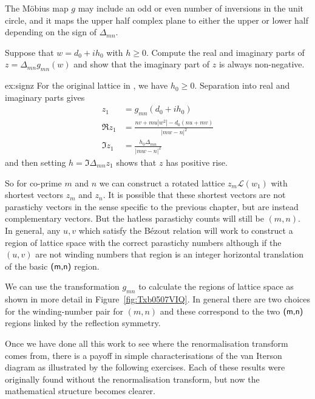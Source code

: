 The M\"obius map $g$ may include an odd or even number of inversions in the unit circle, and it maps the upper half complex plane to either the upper or lower half depending on the sign of $\Delta_{mn}$. 

\begin{jExercise}\label{ex:signz}
	Suppose that $w=d_0+ih_0$ with $h\geq 0$. Compute the real and imaginary parts of $z = \Delta_{mn}g_{mn}(w)$ and show that the imaginary part of $z$ is always non-negative.
\end{jExercise}

\begin{jAnswer}{ex:signz}{
For the original lattice in , we have $h_0\geq0$. Separation into real and imaginary parts  gives
	\begin{align}
		z_1 &= g_{mn}(d_0+ih_0) 
		\\
		\Re z_1 &= 
		\frac{n v + m u| w^2|	- d_0( n u + m v)}{|m w-n|^2} 
			\\
			\Im z_1 &=
	\frac{	 h_0 \Delta_{mn}}{|m w-n|^2}
	\label{eq:gReImA}
\end{align}
and then setting $h=\Im \Delta_{mn}z_1$ shows that $z$ has positive rise.
}\end{jAnswer}

 So for co-prime $m$ and $n$ we can construct a rotated lattice $z_m \mathcal{L}(w_1)$  with shortest vectors $z_m$ and $z_n$. It is possible that these shortest vectors are not parastichy vectors in the sense specific to the previous chapter, but are instead complementary vectors. But the hatless parastichy counts will still be $(m,n)$. In general, any $u,v$ which satisfy the B\'ezout relation will work to construct a region of lattice space with the correct parastichy numbers although if the $(u,v)$ are not winding numbers that region is an integer horizontal translation of the basic $\textsf{(m,n)}$ region.
 	


We can use the transformation $g_{mn}$ to calculate the regions of
lattice space as shown in more detail in Figure~\ref{fig:Txb0507VIQ}.
In general there are two choices for the winding-number pair for $(m,n)$ and these correspond to the two $\textsf{(m,n)}$ regions linked by the reflection symmetry.



Once we have done all this work to see where the renormalisation transform comes from, there is a payoff in simple characterisations of the van Iterson diagram  as illustrated by the following exercises. Each of these results were originally found without the renormalisation transform, but now the mathematical structure becomes clearer. 


